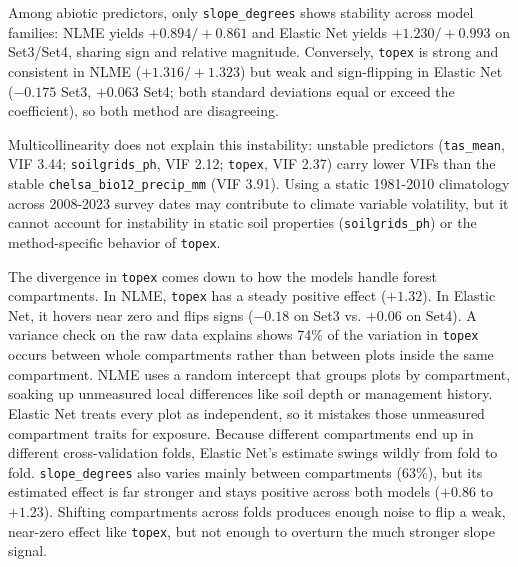 Among abiotic predictors, only \texttt{slope\_degrees} shows stability across model families: NLME yields $+0.894/+0.861$ and Elastic Net yields $+1.230/+0.993$ on Set3/Set4, sharing sign and relative magnitude. Conversely, \texttt{topex} is strong and consistent in NLME ($+1.316/+1.323$) but weak and sign-flipping in Elastic Net ($-0.175$ Set3, $+0.063$ Set4; both standard deviations equal or exceed the coefficient), so both method are disagreeing. 

Multicollinearity does not explain this instability: unstable predictors (\texttt{tas\_mean}, VIF 3.44; \texttt{soilgrids\_ph}, VIF 2.12; \texttt{topex}, VIF 2.37) carry lower VIFs than the stable \texttt{chelsa\_bio12\_precip\_mm} (VIF 3.91). Using a static 1981-2010 climatology across 2008-2023 survey dates may contribute to climate variable volatility, but it cannot account for instability in static soil properties (\texttt{soilgrids\_ph}) or the method-specific behavior of \texttt{topex}. 

The divergence in \texttt{topex} comes down to how the models handle forest compartments. In NLME, \texttt{topex} has a steady positive effect ($+1.32$). In Elastic Net, it hovers near zero and flips signs ($-0.18$ on Set3 vs. $+0.06$ on Set4). A variance check on the raw data explains shows 74\% of the variation in \texttt{topex} occurs between whole compartments rather than between plots inside the same compartment. NLME uses a random intercept that groups plots by compartment, soaking up unmeasured local differences like soil depth or management history. Elastic Net treats every plot as independent, so it mistakes those unmeasured compartment traits for exposure. Because different compartments end up in different cross-validation folds, Elastic Net's estimate swings wildly from fold to fold. \texttt{slope\_degrees} also varies mainly between compartments (63\%), but its estimated effect is far stronger and stays positive across both models ($+0.86$ to $+1.23$). Shifting compartments across folds produces enough noise to flip a weak, near-zero effect like \texttt{topex}, but not enough to overturn the much stronger slope signal.

